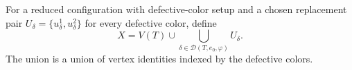 \begin{definition}
For a reduced configuration with defective-color setup and a chosen
replacement pair $U_\delta=\{u^1_\delta,u^2_\delta\}$ for every defective
color, define
\[
 X=V(T)\cup\bigcup_{\delta\in\mathcal D(T,e_0,\varphi)}U_\delta.
\]
The union is a union of vertex identities indexed by the defective colors.
\end{definition}
